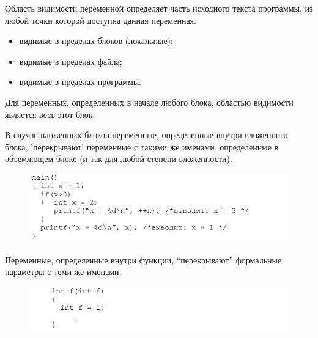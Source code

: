 \documentclass{beamer}
\begin{document}
\begin{frame}
\begin{block}{Область видимости переменной}
определяет часть исходного текста программы, из любой точки которой доступна данная переменная.
\end{block}
\begin{itemize}
\item видимые в пределах блоков (локальные);
\item видимые в пределах файла;
\item видимые в пределах программы.
\end{itemize}
\end{frame}

\begin{frame}
Для переменных, определенных в начале любого блока, областью видимости является весь этот блок. 

В случае вложенных блоков переменные, определенные внутри вложенного блока, 'перекрывают' переменные с такими же именами, определенные в объемлющем блоке (и так для любой степени вложенности).
\begin{figure}[h]
\centering
\includegraphics[scale=0.5]{images/lec03-pic06.png}
\end{figure}
\end{frame}

\begin{frame}
Переменные, определенные внутри функции, “перекрывают” формальные параметры с теми же именами.
\begin{figure}[h]
\centering
\includegraphics[scale=0.5]{images/lec03-pic07.png}
\end{figure}
\end{frame}
\end{document}
